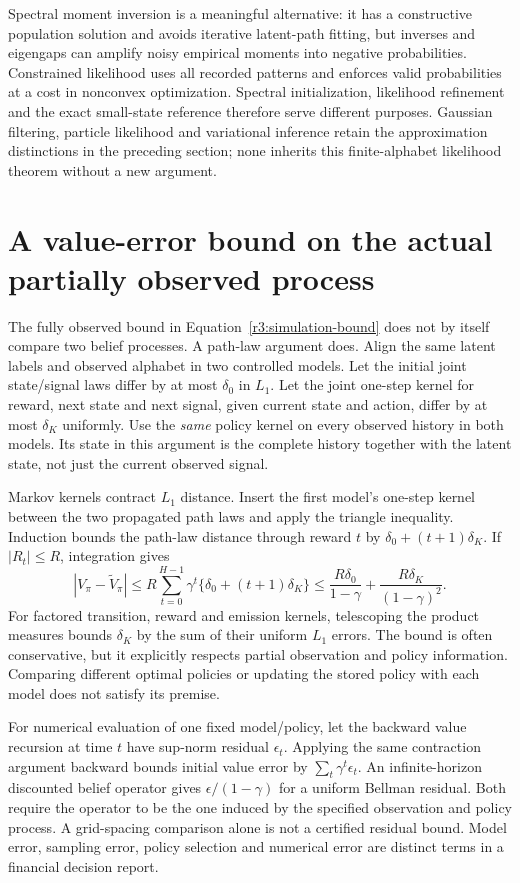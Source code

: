 Spectral moment inversion is a meaningful alternative: it has a constructive
population solution and avoids iterative latent-path fitting, but inverses
and eigengaps can amplify noisy empirical moments into negative probabilities.
Constrained likelihood uses all recorded patterns and enforces valid
probabilities at a cost in nonconvex optimization. Spectral initialization,
likelihood refinement and the exact small-state reference therefore serve
different purposes. Gaussian filtering, particle likelihood and variational
inference retain the approximation distinctions in the preceding section;
none inherits this finite-alphabet likelihood theorem without a new argument.

\section{A value-error bound on the actual partially observed process}
\label{s4:pomdp-error}
The fully observed bound in Equation~\eqref{r3:simulation-bound} does not
by itself compare two belief processes. A path-law argument does. Align
the same latent labels and observed alphabet in two controlled models.
Let the initial joint state/signal laws differ by at most $\delta_0$ in
$L_1$. Let the joint one-step kernel for reward, next state and next signal,
given current state and action, differ by at most $\delta_K$ uniformly.
Use the \emph{same} policy kernel on every observed history in both models.
Its state in this argument is the complete history together with the latent
state, not just the current observed signal.

Markov kernels contract $L_1$ distance. Insert the first model's one-step
kernel between the two propagated path laws and apply the triangle
inequality. Induction bounds the path-law distance through reward $t$ by
$\delta_0+(t+1)\delta_K$. If $|R_t|\le R$, integration gives
\begin{equation}
 |V_\pi-\widetilde V_\pi|
 \le R\sum_{t=0}^{H-1}\gamma^t
               \{\delta_0+(t+1)\delta_K\}
 \le \frac{R\delta_0}{1-\gamma}
       +\frac{R\delta_K}{(1-\gamma)^2}.
 \label{s4:pomdp-path-bound}
\end{equation}
For factored transition, reward and emission kernels, telescoping the
product measures bounds $\delta_K$ by the sum of their uniform $L_1$
errors. The bound is often conservative, but it explicitly respects partial
observation and policy information. Comparing different optimal policies
or updating the stored policy with each model does not satisfy its premise.

For numerical evaluation of one fixed model/policy, let the backward value
recursion at time $t$ have sup-norm residual $\epsilon_t$. Applying the
same contraction argument backward bounds initial value error by
$\sum_t\gamma^t\epsilon_t$. An infinite-horizon discounted belief
operator gives $\epsilon/(1-\gamma)$ for a uniform Bellman residual.
Both require the operator to be the one induced by the specified observation
and policy process. A grid-spacing comparison alone is not a certified
residual bound. Model error, sampling error, policy selection and numerical
error are distinct terms in a financial decision report.
